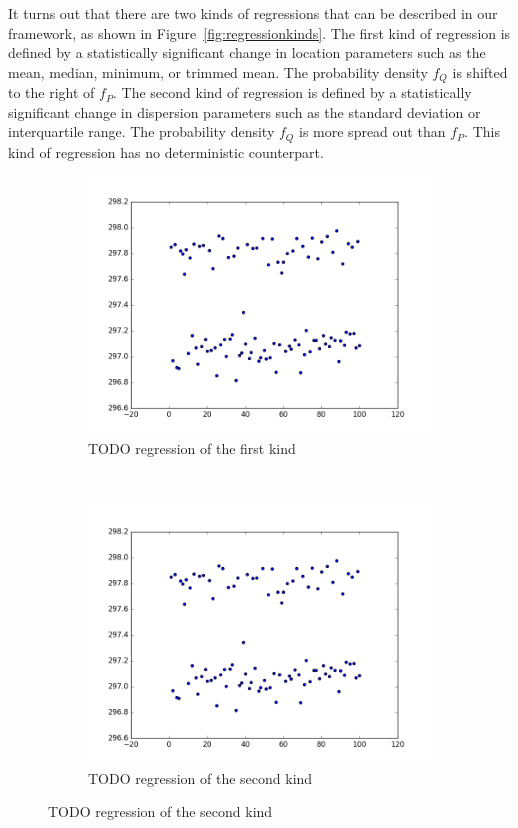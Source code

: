 \documentclass[conference]{IEEEtran}
\begin{document}
It turns out that there are two kinds of regressions that can be described in our framework, as shown in Figure~\ref{fig:regressionkinds}. The first kind of regression is defined by a statistically significant change in location parameters such as the mean, median, minimum, or trimmed mean. The probability density $f_Q$ is shifted to the right of $f_P$. The second kind of regression is defined by a statistically significant change in dispersion parameters such as the standard deviation or interquartile range. The probability density $f_Q$ is more spread out than $f_P$. This kind of regression has no deterministic counterpart.

\begin{figure}
\centering

\begin{subfigure}{0.22\textwidth}
    \centering
    \includegraphics[width=\textwidth]{experiments/images/mean_repeated_branchsum}
    \caption{TODO regression of the first kind}
\end{subfigure}%
~
\begin{subfigure}{0.22\textwidth}
    \centering
    \includegraphics[width=\textwidth]{experiments/images/mean_repeated_branchsum}
    \caption{TODO regression of the second kind}
\end{subfigure}


\end{figure}
\end{document}
